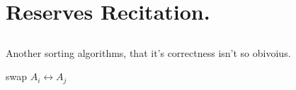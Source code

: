 


\setcounter{chapter}{4}
\chapter{Reserves Recitation.} 



\section{}
Another sorting algorithms, that it's correctness isn't so obivoius.  


\begin{algorithm}
\SetAlgoLined
{}
 {
   {
     {
      swap $A_{i} \leftrightarrow A_{j}$
    }
  }
}


\end{algorithm}

